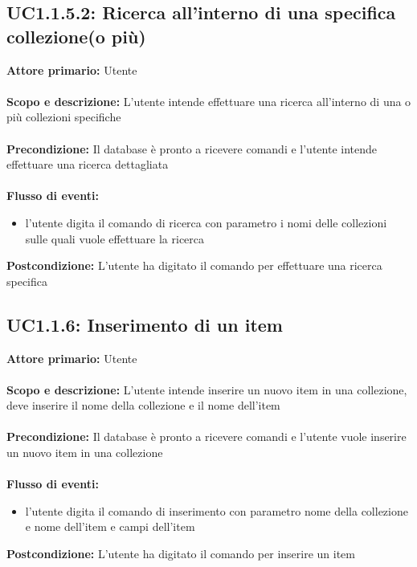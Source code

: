 \documentclass{scalatekids-article}
\begin{document}
\subsection{UC1.1.5.2: Ricerca all'interno di una specifica collezione(o più)}
\textbf{Attore primario:} Utente \\ \\
\textbf{Scopo e descrizione:} L’utente intende effettuare una ricerca all’interno di una o più collezioni specifiche\\ \\
\textbf{Precondizione:} Il database è pronto a ricevere comandi e l’utente intende effettuare una ricerca dettagliata\\ \\
\textbf{Flusso di eventi:}
\begin{itemize}
\item l’utente digita il comando di ricerca con parametro i nomi delle collezioni sulle quali vuole effettuare la ricerca
\end{itemize}
\textbf{Postcondizione:} L’utente ha digitato il comando per effettuare una ricerca specifica
\subsection{UC1.1.6: Inserimento di un item}
\textbf{Attore primario:} Utente \\ \\
\textbf{Scopo e descrizione:} L’utente intende inserire un nuovo item in una collezione, deve inserire il nome della collezione e il nome dell’item\\ \\
\textbf{Precondizione:} Il database è pronto a ricevere comandi e l’utente vuole inserire un nuovo item in una collezione\\ \\
\textbf{Flusso di eventi:}
\begin{itemize}
\item l’utente digita il comando di inserimento con parametro nome della collezione e nome dell’item e campi dell’item
\end{itemize}
\textbf{Postcondizione:} L’utente ha digitato il comando per inserire un item
\end{document}
